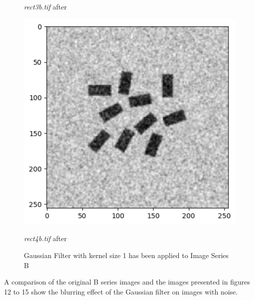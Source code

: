 \documentclass[runningheads]{llncs}
\begin{document}
\begin{figure}[h!]
\begin{minipage}[h]{0.47\linewidth}
\begin{center}
\caption{\emph{rect3b.tif} after}
\label{hb3-Gaussian and Kernel 1}
\end{center}
\end{minipage}
\hfill
\begin{minipage}[h]{0.47\linewidth}
\begin{center}
\includegraphics[width=1\linewidth]{Report/Result_Images/image_hb4.png} 
\caption{\emph{rect4b.tif} after}
\label{hb4-Gaussian and Kernel 1}
\end{center}
\end{minipage}
\caption*{Gaussian Filter with kernel size 1 has been applied to Image Series B}
\label{hb1-4 Gaussian1}
\end{figure}

A comparison of the original B series images and the images presented in figures 12 to 15 show the blurring effect of the Gaussian filter on images with noise. 


\newpage
\end{document}
